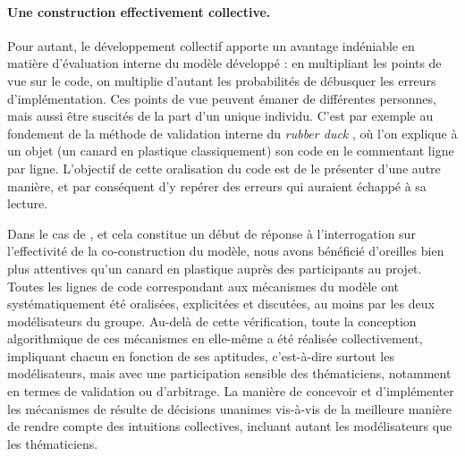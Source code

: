 \paragraph{Une construction effectivement collective.}

Pour autant, le développement collectif apporte un avantage indéniable en matière d'évaluation interne du modèle développé :
	en multipliant les points de vue sur le code, on multiplie d'autant les probabilités de débusquer les erreurs d'implémentation.
Ces points de vue peuvent émaner de différentes personnes, mais aussi être suscités de la part d'un unique individu.
C'est par exemple au fondement de la méthode de validation interne du \og \textit{rubber duck}\fg{} \autocite{noauthor_methode_2019}, où l'on explique à un objet (un \og canard en plastique\fg{} classiquement) son code en le commentant ligne par ligne.
L'objectif de cette oralisation du code est de le présenter d'une autre manière, et par conséquent d'y repérer des erreurs qui auraient échappé à sa \og lecture\fg{}.

Dans le cas de \simfeodal{}, et cela constitue un début de réponse à l'interrogation sur l'effectivité de la co-construction du modèle, nous avons bénéficié d'oreilles bien plus attentives qu'un canard en plastique auprès des participants au projet.
Toutes les lignes de code correspondant aux mécanismes du modèle ont systématiquement été oralisées, explicitées et discutées, au moins par les deux \og modélisateurs\fg{} du groupe.
Au-delà de cette vérification, toute la conception algorithmique de ces mécanismes en elle-même a été réalisée collectivement, impliquant chacun en fonction de ses aptitudes, c'est-à-dire surtout les modélisateurs, mais avec une participation sensible des thématiciens, notamment en termes de validation ou d'arbitrage.
La manière de concevoir et d'implémenter les mécanismes de \simfeodal{} résulte de décisions unanimes vis-à-vis de la meilleure manière de rendre compte des intuitions collectives, incluant autant les modélisateurs que les thématiciens. 

